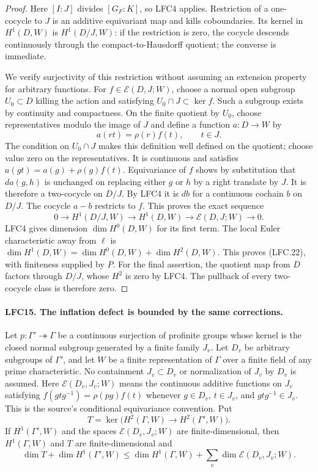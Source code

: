 \begin{proof}
Here \([I:J]\) divides \([G_F:K]\), so LFC4 applies.
Restriction of a one-cocycle to \(J\) is an additive
equivariant map and kills coboundaries.
Its kernel in \(H^1(D,W)\) is \(H^1(D/J,W)\):
if the restriction is zero, the cocycle descends
continuously through the compact-to-Hausdorff quotient;
the converse is immediate.

We verify surjectivity of this restriction without
assuming an extension property for arbitrary functions.
For \(f\in\mathcal E(D,J;W)\), choose a normal open
subgroup \(U_0\subset D\) killing the action and satisfying
\(U_0\cap J\subset\ker f\).  Such a subgroup exists
by continuity and compactness.  On the finite quotient
by \(U_0\), choose representatives modulo the image of \(J\)
and define a function \(a:D\to W\) by
\[
                 a(r t)=\rho(r)f(t),\qquad t\in J.
 \]
The condition on \(U_0\cap J\) makes this definition
well defined on the quotient; choose value zero on
the representatives.  It is continuous and satisfies
\(a(g t)=a(g)+\rho(g)f(t)\).
Equivariance of \(f\) shows by substitution that
\(d a(g,h)\) is unchanged on replacing either \(g\) or \(h\)
by a right translate by \(J\).  It is therefore a
two-cocycle on \(D/J\).
By LFC4 it is \(d b\) for a continuous cochain \(b\)
on \(D/J\).  The cocycle \(a-b\) restricts to \(f\).
This proves the exact sequence
\[
 0\longrightarrow H^1(D/J,W)\longrightarrow H^1(D,W)
       \longrightarrow\mathcal E(D,J;W)\longrightarrow0.
 \]
LFC4 gives dimension \(\dim H^0(D,W)\) for its first term.
The local Euler characteristic away from \(\ell\) is
\(\dim H^1(D,W)=\dim H^0(D,W)+\dim H^2(D,W)\).
This proves (LFC.22), with finiteness supplied by \(P\).
For the final assertion, the quotient map from \(D\)
factors through \(D/J\), whose \(H^2\) is zero by LFC4.
The pullback of every two-cocycle class is therefore zero.
\end{proof}

\paragraph{LFC15. The inflation defect is bounded by the same corrections.}
\label{claim:LFC15}
Let \(p:\Gamma'\twoheadrightarrow\Gamma\) be a continuous
surjection of profinite groups whose kernel is the closed
normal subgroup generated by a finite family \(J_v\).
Let \(D_v\) be arbitrary subgroups of \(\Gamma'\), and let
\(W\) be a finite representation of \(\Gamma\) over a finite
field of any prime characteristic.
No containment \(J_v\subset D_v\) or normalization of \(J_v\)
by \(D_v\) is assumed.  Here \(\mathcal E(D_v,J_v;W)\)
means the continuous additive functions on \(J_v\)
satisfying
\(f(g t g^{-1})=\rho(p g)f(t)\) whenever \(g\in D_v\),
\(t\in J_v\), and \(g t g^{-1}\in J_v\).
This is the source's conditional equivariance convention.
Put
\[
 T=\ker\bigl(H^2(\Gamma,W)\to H^2(\Gamma',W)\bigr).
 \]
If \(H^1(\Gamma',W)\) and the spaces
\(\mathcal E(D_v,J_v;W)\) are finite-dimensional, then
\(H^1(\Gamma,W)\) and \(T\) are finite-dimensional and
\[
 \dim T+\dim H^1(\Gamma',W)
   \le\dim H^1(\Gamma,W)+
                          \sum_v\dim\mathcal E(D_v,J_v;W).
                                                        \tag{LFC.23}
\]

